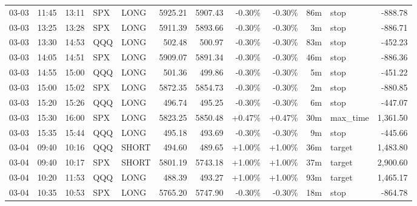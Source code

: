 \documentclass[11pt,a4paper,twoside]{article}
\begin{document}
\begin{center}
\begin{longtable}{>{\color{txtmain}}l l l l l r r r r r >{\color{txtmain}}l r}
03-03 & 11:45 & 13:11 & SPX & LONG & 5925.21 & 5907.43 & \textcolor{lossred}{-0.30\%} & \textcolor{lossred}{-0.30\%} & 86m & stop & \textcolor{lossred}{-888.78} \\
03-03 & 13:25 & 13:28 & SPX & LONG & 5911.39 & 5893.66 & \textcolor{lossred}{-0.30\%} & \textcolor{lossred}{-0.30\%} & 3m & stop & \textcolor{lossred}{-886.71} \\
03-03 & 13:30 & 14:53 & QQQ & LONG & 502.48 & 500.97 & \textcolor{lossred}{-0.30\%} & \textcolor{lossred}{-0.30\%} & 83m & stop & \textcolor{lossred}{-452.23} \\
03-03 & 14:05 & 14:51 & SPX & LONG & 5909.07 & 5891.34 & \textcolor{lossred}{-0.30\%} & \textcolor{lossred}{-0.30\%} & 46m & stop & \textcolor{lossred}{-886.36} \\
03-03 & 14:55 & 15:00 & QQQ & LONG & 501.36 & 499.86 & \textcolor{lossred}{-0.30\%} & \textcolor{lossred}{-0.30\%} & 5m & stop & \textcolor{lossred}{-451.22} \\
03-03 & 15:00 & 15:02 & SPX & LONG & 5872.35 & 5854.73 & \textcolor{lossred}{-0.30\%} & \textcolor{lossred}{-0.30\%} & 2m & stop & \textcolor{lossred}{-880.85} \\
03-03 & 15:20 & 15:26 & QQQ & LONG & 496.74 & 495.25 & \textcolor{lossred}{-0.30\%} & \textcolor{lossred}{-0.30\%} & 6m & stop & \textcolor{lossred}{-447.07} \\
03-03 & 15:30 & 16:00 & SPX & LONG & 5823.25 & 5850.48 & \textcolor{wingreen}{+0.47\%} & \textcolor{wingreen}{+0.47\%} & 30m & max\_time & \textcolor{wingreen}{1,361.50} \\
03-03 & 15:35 & 15:44 & QQQ & LONG & 495.18 & 493.69 & \textcolor{lossred}{-0.30\%} & \textcolor{lossred}{-0.30\%} & 9m & stop & \textcolor{lossred}{-445.66} \\
03-04 & 09:40 & 10:16 & QQQ & SHORT & 494.60 & 489.65 & \textcolor{wingreen}{+1.00\%} & \textcolor{wingreen}{+1.00\%} & 36m & target & \textcolor{wingreen}{1,483.80} \\
03-04 & 09:40 & 10:17 & SPX & SHORT & 5801.19 & 5743.18 & \textcolor{wingreen}{+1.00\%} & \textcolor{wingreen}{+1.00\%} & 37m & target & \textcolor{wingreen}{2,900.60} \\
03-04 & 10:20 & 11:53 & QQQ & LONG & 488.39 & 493.27 & \textcolor{wingreen}{+1.00\%} & \textcolor{wingreen}{+1.00\%} & 93m & target & \textcolor{wingreen}{1,465.17} \\
03-04 & 10:35 & 10:53 & SPX & LONG & 5765.20 & 5747.90 & \textcolor{lossred}{-0.30\%} & \textcolor{lossred}{-0.30\%} & 18m & stop & \textcolor{lossred}{-864.78} \\

\end{longtable}
\end{center}
\end{document}
